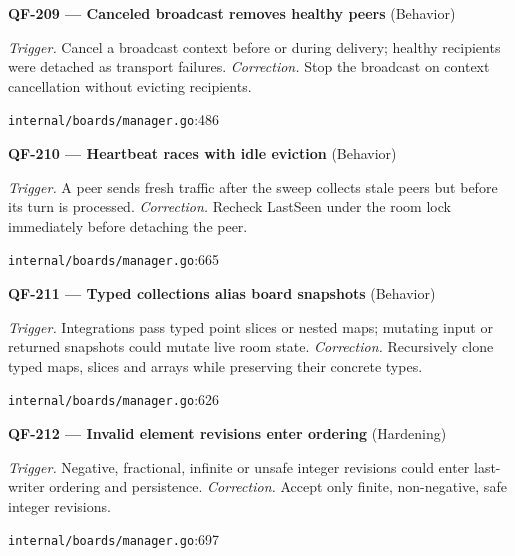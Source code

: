 \begin{minipage}{\linewidth}
\textbf{QF-209 --- Canceled broadcast removes healthy peers} {\scriptsize\color{accent}(Behavior)}\par
\textit{Trigger.} Cancel a broadcast context before or during delivery; healthy recipients were detached as transport failures. \textit{Correction.} Stop the broadcast on context cancellation without evicting recipients.\par
{\scriptsize\color{muted}\nolinkurl{internal/boards/manager.go}:486}\par
\end{minipage}\par\vspace{7pt}
\begin{minipage}{\linewidth}
\textbf{QF-210 --- Heartbeat races with idle eviction} {\scriptsize\color{accent}(Behavior)}\par
\textit{Trigger.} A peer sends fresh traffic after the sweep collects stale peers but before its turn is processed. \textit{Correction.} Recheck LastSeen under the room lock immediately before detaching the peer.\par
{\scriptsize\color{muted}\nolinkurl{internal/boards/manager.go}:665}\par
\end{minipage}\par\vspace{7pt}
\begin{minipage}{\linewidth}
\textbf{QF-211 --- Typed collections alias board snapshots} {\scriptsize\color{accent}(Behavior)}\par
\textit{Trigger.} Integrations pass typed point slices or nested maps; mutating input or returned snapshots could mutate live room state. \textit{Correction.} Recursively clone typed maps, slices and arrays while preserving their concrete types.\par
{\scriptsize\color{muted}\nolinkurl{internal/boards/manager.go}:626}\par
\end{minipage}\par\vspace{7pt}
\begin{minipage}{\linewidth}
\textbf{QF-212 --- Invalid element revisions enter ordering} {\scriptsize\color{accent}(Hardening)}\par
\textit{Trigger.} Negative, fractional, infinite or unsafe integer revisions could enter last-writer ordering and persistence. \textit{Correction.} Accept only finite, non-negative, safe integer revisions.\par
{\scriptsize\color{muted}\nolinkurl{internal/boards/manager.go}:697}\par
\end{minipage}\par\vspace{7pt}
